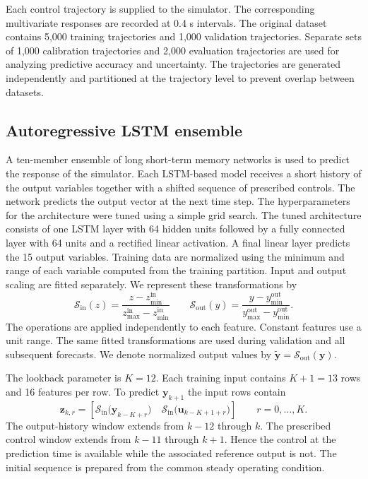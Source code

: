 Each control trajectory is supplied to the simulator. The corresponding multivariate responses are recorded at 0.4 s intervals. The original dataset contains 5{,}000 training trajectories and 1{,}000 validation trajectories. Separate sets of 1{,}000 calibration trajectories and 2{,}000 evaluation trajectories are used for analyzing predictive accuracy and uncertainty. The trajectories are generated independently and partitioned at the trajectory level to prevent overlap between datasets.

\subsection{Autoregressive LSTM ensemble}
\label{sec:methods:forecasting}

A ten-member ensemble of long short-term memory networks is used to predict the response of the simulator. Each LSTM-based model receives a short history of the output variables together with a shifted sequence of prescribed controls. The network predicts the output vector at the next time step. The hyperparameters for the architecture were tuned using a simple grid search. The tuned architecture consists of one LSTM layer with 64 hidden units followed by a fully connected layer with 64 units and a rectified linear activation. A final linear layer predicts the 15 output variables. 
Training data are normalized using the minimum and range of each variable computed from the training partition. Input and output scaling are fitted separately. We represent these transformations by
\begin{equation}
 \mathcal{S}_{\mathrm{in}}(z)=
 \frac{z-z_{\min}^{\mathrm{in}}}{z_{\max}^{\mathrm{in}}-z_{\min}^{\mathrm{in}}}
 \qquad
 \mathcal{S}_{\mathrm{out}}(y)=
 \frac{y-y_{\min}^{\mathrm{out}}}{y_{\max}^{\mathrm{out}}-y_{\min}^{\mathrm{out}}}.
 \label{eq:mace:scaling}
\end{equation}
The operations are applied independently to each feature. Constant features use a unit range. The same fitted transformations are used during validation and all subsequent forecasts. We denote normalized output values by $\widetilde{\mathbf y}=\mathcal{S}_{\mathrm{out}}(\mathbf y)$.

The lookback parameter is $K=12$. Each training input contains $K+1=13$ rows and 16 features per row. To predict $\mathbf y_{k+1}$ the input rows contain
\begin{equation}
 \mathbf{z}_{k,r}=
 \left[
 \mathcal S_{\mathrm{in}}\bigl(\mathbf y_{k-K+r}\bigr)
 \quad
 \mathcal S_{\mathrm{in}}\bigl(\mathbf u_{k-K+1+r}\bigr)
 \right]
 \qquad r=0,\ldots,K.
 \label{eq:mace:window}
\end{equation}
The output-history window extends from $k-12$ through $k$. The prescribed control window extends from $k-11$ through $k+1$. Hence the control at the prediction time is available while the associated reference output is not. The initial sequence is prepared from the common steady operating condition.

